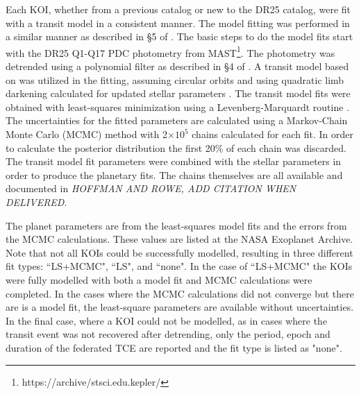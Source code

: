 \label{s:mcmc}

Each KOI, whether from a previous catalog or new to the DR25 catalog, were fit with a transit model in a consistent manner. The model fitting was performed in a similar manner as described in \S5 of \citet{Rowe2015cat}. The basic steps to do the model fits start with the DR25 Q1-Q17 PDC photometry from MAST\footnote{https://archive/stsci.edu.kepler/}. The photometry was detrended using a polynomial filter as described in \S4 of \citet{Rowe2014}. A transit model based on \citet{Mandel2002} was utilized in the fitting, assuming circular orbits and using quadratic limb darkening \citep{Claret2011} calculated for updated stellar parameters \citep{Mathur2017}. The transit model fits were obtained with least-squares minimization using a Levenberg-Marquardt routine \citep{More1980}. The uncertainties for the fitted parameters are calculated using a Markov-Chain Monte Carlo (MCMC) method \citep{Ford2005AJ} with 2$\times 10^{5}$ chains calculated for each fit. In order to calculate the posterior distribution the first 20\% of each chain was discarded. The transit model fit parameters were combined with the stellar parameters in order to produce the planetary fits. The chains themselves are all available and documented in {\it HOFFMAN AND ROWE, ADD CITATION WHEN DELIVERED}. 

The planet parameters are from the least-squares model fits and the errors from the MCMC calculations. These values are listed at the NASA Exoplanet Archive. Note that not all KOIs could be successfully modelled, resulting in three different fit types: ``LS+MCMC", ``LS", and ``none". In the case of ``LS+MCMC" the KOIs were fully modelled with both a model fit and MCMC calculations were completed. In the cases where the MCMC calculations did not converge but there are is a model fit, the least-square parameters are available without uncertainties. In the final case, where a KOI could not be modelled, as in cases where the transit event was not recovered after detrending, only the period, epoch and duration of the federated TCE are reported and the fit type is listed as "none".
